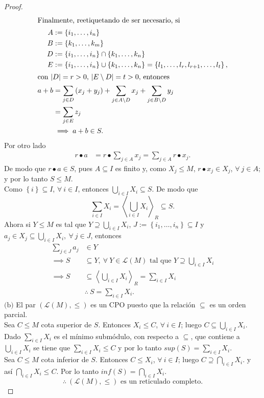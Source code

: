 \documentclass{article}
\newcommand{\crdnlty}[1]{
	\left|#1\right|
}
\newcommand{\lrprth}[1]{
	\left(#1\right)
}
\newcommand{\lrbrack}[1]{
	\left\{#1\right\}
}
\newcommand{\gengroup}[1]{
	\left< #1\right>
}
\newcommand{\genlin}[1]{
	\mathscr{L}\lrprth{#1}
}
\theoremstyle{definition}
\theoremstyle{plain}
\theoremstyle{plain}
\theoremstyle{definition}
\theoremstyle{definition}
\theoremstyle{definition}
\theoremstyle{definition}
\theoremstyle{definition}
\theoremstyle{definition}
\begin{document}
\begin{enumerate}[label=\textbf{Ej \arabic*.}]
\begin{proof}
\begin{align*}
		\intertext{Finalmente, reetiquetando de ser necesario, si}
		A&:=\lrbrack{i_1,\dotsc,i_n}\\
		B&:=\lrbrack{k_1,\dotsc,k_m}\\
		D&:=\lrbrack{i_1,\dotsc,i_n}\cap
		\lrbrack{k_1,\dotsc,k_n}\\
		E&:=\lrbrack{i_1,\dotsc,i_n}\cup
		\lrbrack{k_1,\dotsc,k_n}=\lrbrack{l_1,\dotsc,l_{r},l_{r+1},\dotsc,l_{t}},\\
		\intertext{con $\crdnlty{D}=r>0$, $\crdnlty{E\setminus D}=t>0$, entonces}
		a+b&=\sum_{j\in D}\lrprth{x_j+y_j}+\sum_{j\in A\setminus D}x_j+\sum_{j\in B\setminus D}y_j \\
		&=\sum_{j\in E}z_j\\
		&\implies a+b\in S.
	\end{align*}
	Por otro lado
	\begin{align*}
		r\bullet a&=r\bullet\sum_{j\in A}x_j=\sum_{j\in A}r\bullet x_j.
	\end{align*}
	De modo que $r\bullet a\in S$, pues $A\subseteq I$ es finito y, como $X_j\leq M$, $r\bullet x_j\in X_j$, $\forall\ j\in A$; y por lo tanto $S\leq M$. \\
	Como $\lrbrack{i}\subseteq I$, $\forall\ i\in I$, entonces
	$\bigcup_{i\in I}X_i\subseteq S$. De modo que
	\begin{equation*}
		\sum_{i\in I}X_i=\gengroup{\bigcup_{i\in I}X_i}_R\subseteq S.
	\end{equation*}
	Ahora si $Y\leq M$ es tal que $Y\supseteq \bigcup_{i\in I}X_i$, $J:=\lrbrack{i_1,\dotsc,i_n}\subseteq I$ y $a_j\in X_j\subseteq\bigcup_{i\in I}X_i,\ \forall\ j\in J$, entonces
	\begin{align*}
		\sum_{j\in J}a_j&\in Y\\
		\implies S&\subseteq Y,\ \forall\ Y\in\genlin{M}\text{ tal que } Y\supseteq \bigcup_{i\in I}X_i\\
		\implies S&\subseteq \gengroup{\bigcup_{i\in I}X_i}_R=\sum_{i\in I}X_i\\
		&\therefore\ S=\sum_{i\in I}X_i.
	\end{align*}
	$\boxed{\text{(b)}}$ El par $(\genlin{M},\leq)$ es un CPO puesto que la relación $\subseteq$ es un orden parcial.\\
	Sea $C\leq M$ cota superior de $S$. Entonces $X_i\leq C$, $\forall\ i\in I$; luego $C\subseteq \bigcup_{i\in I}X_i$. Dado $\sum_{i\in I}X_i$ es el mínimo submódulo, con respecto a $\subseteq$, que contiene a $\bigcup_{i\in I}X_i$ se tiene que $\sum_{i\in I}X_i\leq C$ y por lo tanto $sup\lrprth{S}=\sum_{i\in I}X_i$.\\
	Sea $C\leq M$ cota inferior de $S$. Entonces $C\leq X_i$, $\forall\ i\in I$; luego $C\supseteq \bigcap_{i\in I}X_i$. y así $\bigcap_{i\in I}X_i\leq C$. Por lo tanto $inf\lrprth{S}=\bigcap_{i\in I}X_i$.\\
	\begin{equation*}
		\therefore\ \lrprth{\genlin{M},\leq}\text{ es un reticulado completo.}
	\end{equation*}
\end{proof}


\end{enumerate}
\end{document}
